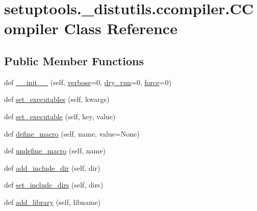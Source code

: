 \hypertarget{classsetuptools_1_1__distutils_1_1ccompiler_1_1CCompiler}{}\section{setuptools.\+\_\+distutils.\+ccompiler.\+C\+Compiler Class Reference}
\label{classsetuptools_1_1__distutils_1_1ccompiler_1_1CCompiler}
\subsection*{Public Member Functions}
\begin{DoxyCompactItemize}
\item 
def \hyperlink{classsetuptools_1_1__distutils_1_1ccompiler_1_1CCompiler_afe74a8de186dbca0fcea104a0d990ce8}{\+\_\+\+\_\+init\+\_\+\+\_\+} (self, \hyperlink{classsetuptools_1_1__distutils_1_1ccompiler_1_1CCompiler_a9a5e60075149b592d4dc30ee589938e5}{verbose}=0, \hyperlink{classsetuptools_1_1__distutils_1_1ccompiler_1_1CCompiler_afcfe771cc148246716dcdca91a7bc565}{dry\+\_\+run}=0, \hyperlink{classsetuptools_1_1__distutils_1_1ccompiler_1_1CCompiler_a76287209c0e893db1b9367272deb2aeb}{force}=0)
\item 
def \hyperlink{classsetuptools_1_1__distutils_1_1ccompiler_1_1CCompiler_a40579720eea351f55160dbce86fbbb21}{set\+\_\+executables} (self, kwargs)
\item 
def \hyperlink{classsetuptools_1_1__distutils_1_1ccompiler_1_1CCompiler_a7988e027118d9a2de04e36bfb3d5dce4}{set\+\_\+executable} (self, key, value)
\item 
def \hyperlink{classsetuptools_1_1__distutils_1_1ccompiler_1_1CCompiler_a217663e09d8712e2c329a2be61bda4dc}{define\+\_\+macro} (self, name, value=None)
\item 
def \hyperlink{classsetuptools_1_1__distutils_1_1ccompiler_1_1CCompiler_a3114db66f48a4795a372046c75de13ad}{undefine\+\_\+macro} (self, name)
\item 
def \hyperlink{classsetuptools_1_1__distutils_1_1ccompiler_1_1CCompiler_a54b731cee7e96e87a1d4f08e4cbc249c}{add\+\_\+include\+\_\+dir} (self, dir)
\item 
def \hyperlink{classsetuptools_1_1__distutils_1_1ccompiler_1_1CCompiler_a17d11c3886ab77a8de5eab72e4ebc0fb}{set\+\_\+include\+\_\+dirs} (self, dirs)
\item 
def \hyperlink{classsetuptools_1_1__distutils_1_1ccompiler_1_1CCompiler_a423fe89e63fee4581ba06a23284ba5c2}{add\+\_\+library} (self, libname)

\end{DoxyCompactItemize}
